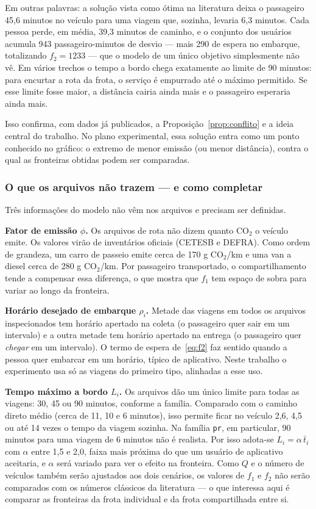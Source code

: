 \documentclass[12pt,a4paper]{article}
\theoremstyle{plain}
\begin{document}
Em outras palavras: a solução vista como ótima na literatura deixa o passageiro 45,6 minutos no veículo para uma viagem que, sozinha, levaria 6,3 minutos. Cada pessoa perde, em média, 39,3 minutos de caminho, e o conjunto dos usuários acumula 943 passageiro-minutos de desvio --- mais 290 de espera no embarque, totalizando $f_2 = 1233$ --- que o modelo de um único objetivo simplesmente não vê. Em vários trechos o tempo a bordo chega exatamente ao limite de 90 minutos: para encurtar a rota da frota, o serviço é empurrado até o máximo permitido. Se esse limite fosse maior, a distância cairia ainda mais e o passageiro esperaria ainda mais.

Isso confirma, com dados já publicados, a Proposição~\ref{prop:conflito} e a ideia central do trabalho. No plano experimental, essa solução entra como um ponto conhecido no gráfico: o extremo de menor emissão (ou menor distância), contra o qual as fronteiras obtidas podem ser comparadas.

\subsubsection{O que os arquivos não trazem --- e como completar}
\label{sec:parametros}

Três informações do modelo não vêm nos arquivos e precisam ser definidas.

\textbf{Fator de emissão $\phi$.} Os arquivos de rota não dizem quanto $\text{CO}_2$ o veículo emite. Os valores virão de inventários oficiais (CETESB e DEFRA). Como ordem de grandeza, um carro de passeio emite cerca de 170 g $\text{CO}_2$/km e uma van a diesel cerca de 280 g $\text{CO}_2$/km. Por passageiro transportado, o compartilhamento tende a compensar essa diferença, o que mostra que $f_1$ tem espaço de sobra para variar ao longo da fronteira.

\textbf{Horário desejado de embarque $\rho_i$.} Metade das viagens em todos os arquivos inspecionados tem horário apertado na coleta (o passageiro quer sair em um intervalo) e a outra metade tem horário apertado na entrega (o passageiro quer \textit{chegar} em um intervalo). O termo de espera de~\eqref{eq:f2} faz sentido quando a pessoa quer embarcar em um horário, típico de aplicativo. Neste trabalho o experimento usa só as viagens do primeiro tipo, alinhadas a esse uso.

\textbf{Tempo máximo a bordo $L_i$.} Os arquivos dão um único limite para todas as viagens: 30, 45 ou 90 minutos, conforme a família. Comparado com o caminho direto médio (cerca de 11, 10 e 6 minutos), isso permite ficar no veículo 2,6, 4,5 ou até 14 vezes o tempo da viagem sozinha. Na família \texttt{pr}, em particular, 90 minutos para uma viagem de 6 minutos não é realista. Por isso adota-se $L_i = \alpha\,\bar{t}_i$ com $\alpha$ entre 1,5 e 2,0, faixa mais próxima do que um usuário de aplicativo aceitaria, e $\alpha$ será variado para ver o efeito na fronteira. Como $Q$ e o número de veículos também serão ajustados aos dois cenários, os valores de $f_1$ e $f_2$ não serão comparados com os números clássicos da literatura --- o que interessa aqui é comparar as fronteiras da frota individual e da frota compartilhada entre si.
\end{document}
